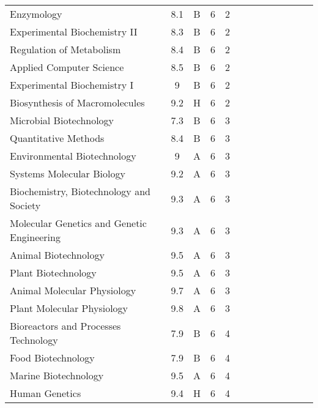 \documentclass[12pt, oneside]{memoir}
\newcommand{\myrowcolour}{\rowcolor[gray]{0.925}}
\begin{document}
\begin{footnotesize}
\begin{longtable}{@{}l cc cc cc cc cc cc}
    \myrowcolour%
    Enzymology                     & 8.1 & B & 6 & 2 \\        
    Experimental Biochemistry II   & 8.3 & B & 6 & 2 \\        

    \myrowcolour%
    Regulation of Metabolism       & 8.4 & B & 6 & 2 \\            
    Applied Computer Science       & 8.5 & B & 6 & 2 \\            

    \myrowcolour%
    Experimental Biochemistry I    & 9   & B & 6 & 2 \\        
    Biosynthesis of Macromolecules & 9.2 & H & 6 & 2 \\            

    \myrowcolour%
    Microbial Biotechnology        & 7.3 & B & 6 & 3 \\                
    Quantitative Methods           & 8.4 & B & 6 & 3 \\                    

    \myrowcolour%
    Environmental Biotechnology    & 9   & A & 6 & 3 \\                 
    Systems Molecular Biology      & 9.2 & A & 6 & 3 \\                    

    \myrowcolour%
    Biochemistry, Biotechnology and Society & 9.3 & A & 6 & 3 \\                    
    Molecular Genetics and Genetic Engineering & 9.3 & A & 6 & 3 \\

    \myrowcolour%
    Animal Biotechnology           & 9.5 & A & 6 & 3 \\     
    Plant Biotechnology            & 9.5 & A & 6 & 3 \\     

    \myrowcolour%
    Animal Molecular Physiology    & 9.7 & A & 6 & 3 \\                    
    Plant Molecular Physiology     & 9.8 & A & 6 & 3 \\ 
    
    \myrowcolour%
    Bioreactors and Processes Technology & 7.9 & B & 6 & 4 \\                    
    Food Biotechnology     & 7.9 & B & 6 & 4 \\
    
    \myrowcolour%
    Marine Biotechnology & 9.5 & A & 6 & 4 \\                    
    Human Genetics & 9.4 & H & 6 & 4 \\               


\end{longtable}
\end{footnotesize}
\end{document}
